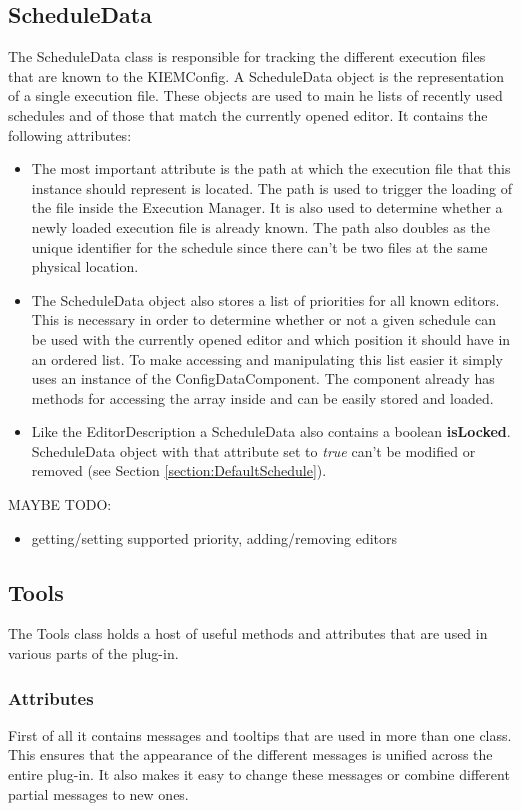 \subsection{ScheduleData}
\label{section:ScheduleData}
The ScheduleData class is responsible for tracking the different execution files that are known
to the \ac{KIEMConfig}. A ScheduleData object is the representation of a single execution file. 
These objects are used to main he lists of recently used schedules and of those that match the 
currently opened editor. It contains the following attributes:
\begin{itemize}
 \item The most important attribute is the path at which the execution file that this instance
should represent is located. The path is used to trigger the loading of the file inside
the Execution Manager. It is also used to determine whether a newly loaded execution file
is already known. The path also doubles as the unique identifier for the schedule since there
can't be two files at the same physical location.
\item The ScheduleData object also stores a list of priorities for all known editors. This is
necessary in order to determine whether or not a given schedule can be used with the currently
opened editor and which position it should have in an ordered list. To make accessing and manipulating
this list easier it simply uses an instance of the ConfigDataComponent. The component already has
methods for accessing the array inside and can be easily stored and loaded.
 \item Like the EditorDescription a ScheduleData also contains a boolean \textbf{isLocked}. ScheduleData
object with that attribute set to \textit{true} can't be modified or removed (see Section \ref{section:DefaultSchedule}).
\end{itemize}

MAYBE TODO:
\begin{itemize}
 \item getting/setting supported priority, adding/removing editors
\end{itemize}

\subsection{Tools}
\label{section:Tools}
The Tools class holds a host of useful methods and attributes that are used in various parts of the plug-in.

\subsubsection{Attributes}
\label{section:ToolsAttributes}
First of all it contains messages and tooltips that are used in more than one class.
This ensures that the appearance of the different messages is unified across the entire plug-in. It also
makes it easy to change these messages or combine different partial messages to new ones.

